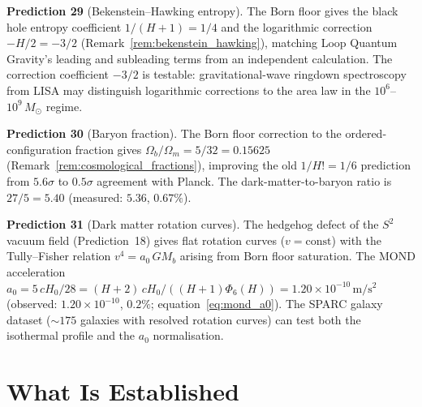 \documentclass[11pt,a4paper]{article}
\theoremstyle{definition}
\theoremstyle{remark}
\begin{document}
\textbf{Prediction 29} (Bekenstein--Hawking entropy). The Born floor gives the black hole entropy coefficient $1/(H+1)=1/4$ and the logarithmic correction $-H/2=-3/2$ (Remark~\ref{rem:bekenstein_hawking}), matching Loop Quantum Gravity's leading and subleading terms from an independent calculation. The correction coefficient $-3/2$ is testable: gravitational-wave ringdown spectroscopy from LISA may distinguish logarithmic corrections to the area law in the $10^6$--$10^9\,M_\odot$ regime.

\textbf{Prediction 30} (Baryon fraction). The Born floor correction to the ordered-configuration fraction gives $\Omega_b/\Omega_m=5/32=0.15625$ (Remark~\ref{rem:cosmological_fractions}), improving the old $1/H!=1/6$ prediction from $5.6\sigma$ to $0.5\sigma$ agreement with Planck. The dark-matter-to-baryon ratio is $27/5=5.40$ (measured: $5.36$, $0.67\%$).

\textbf{Prediction 31} (Dark matter rotation curves). The hedgehog defect of the $S^2$ vacuum field (Prediction~18) gives flat rotation curves ($v=\mathrm{const}$) with the Tully--Fisher relation $v^4=a_0\,GM_b$ arising from Born floor saturation. The MOND acceleration $a_0=5\,cH_0/28=(H+2)\,cH_0/((H+1)\Phi_6(H))=1.20\times 10^{-10}\,\mathrm{m/s^2}$ (observed: $1.20\times 10^{-10}$, $0.2\%$; equation~\ref{eq:mond_a0}). The SPARC galaxy dataset ($\sim\!175$ galaxies with resolved rotation curves) can test both the isothermal profile and the $a_0$ normalisation.

\section{What Is Established}\label{sec:established}
\end{document}
